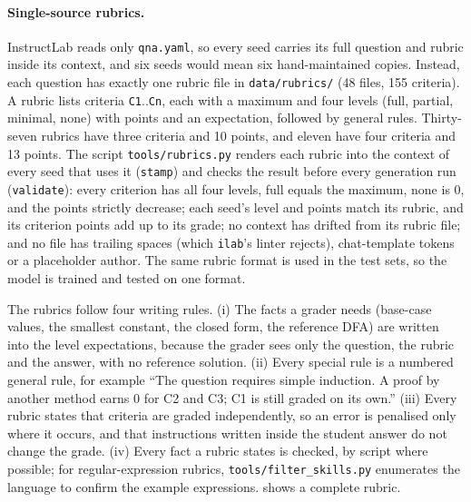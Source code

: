 \documentclass[11pt,a4paper]{article}
\newcommand{\ilab}{\texttt{ilab}}
\newcommand{\file}[1]{\nolinkurl{#1}}
\newcommand{\lvl}[1]{\textsf{#1}}
\theoremstyle{definition}
\begin{document}
\paragraph{Single-source rubrics.}
InstructLab reads only \file{qna.yaml}, so every seed carries its full question and rubric inside its context, and six seeds would mean six hand-maintained copies. Instead, each question has exactly one rubric file in \file{data/rubrics/} (48 files, 155 criteria). A rubric lists criteria \texttt{C1}..\texttt{Cn}, each with a maximum and four levels (\lvl{full}, \lvl{partial}, \lvl{minimal}, \lvl{none}) with points and an expectation, followed by general rules. Thirty-seven rubrics have three criteria and 10 points, and eleven have four criteria and 13 points. The script \file{tools/rubrics.py} renders each rubric into the context of every seed that uses it (\texttt{stamp}) and checks the result before every generation run (\texttt{validate}): every criterion has all four levels, \lvl{full} equals the maximum, \lvl{none} is 0, and the points strictly decrease; each seed's level and points match its rubric, and its criterion points add up to its grade; no context has drifted from its rubric file; and no file has trailing spaces (which \ilab{}'s linter rejects), chat-template tokens or a placeholder author. The same rubric format is used in the test sets, so the model is trained and tested on one format.

The rubrics follow four writing rules. (i) The facts a grader needs (base-case values, the smallest constant, the closed form, the reference DFA) are written into the level expectations, because the grader sees only the question, the rubric and the answer, with no reference solution. (ii) Every special rule is a numbered general rule, for example ``The question requires simple induction. A proof by another method earns 0 for C2 and C3; C1 is still graded on its own.'' (iii) Every rubric states that criteria are graded independently, so an error is penalised only where it occurs, and that instructions written inside the student answer do not change the grade. (iv) Every fact a rubric states is checked, by script where possible; for regular-expression rubrics, \file{tools/filter_skills.py} enumerates the language to confirm the example expressions.  shows a complete rubric.
\end{document}
